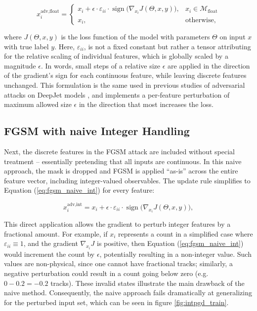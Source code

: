 \begin{equation}
x_i^{\text{adv,float}} = 
    \begin{cases}
        x_i + \epsilon \cdot \varepsilon_{ii} \cdot \operatorname{sign}\!\bigl(\nabla_{x_i} J(\Theta, x, y)\bigr), & x_i\in\mathcal{M}_{\text{float}} \\[6pt]
        x_i, & \text{otherwise},
    \end{cases}
\label{eq:fgsm}
\end{equation}

where $J(\Theta, x, y)$ is the loss function of the model with parameters $\Theta$ on input $x$ with true label $y$. 
Here, $\varepsilon_{ii}$, is not a fixed constant but rather a tensor attributing for the relative scaling of individual features, which is globally scaled by a magnitude $\epsilon$.  
In words, small steps of a relative size $\epsilon$ are applied in the direction of the gradient's sign for each continuous feature, while leaving discrete features unchanged. This formulation is the same used in previous studies of adversarial attacks on DeepJet models \cite{CMS-DP-2024-020}, and implements a per-feature perturbation of maximum allowed size $\epsilon$ in the direction that most increases the loss.

\subsection{FGSM with naive Integer Handling}

Next, the discrete features in the FGSM attack are included without special treatment – essentially pretending that all inputs are continuous. In this naive approach, the mask is dropped and FGSM is applied “as-is” across the entire feature vector, including integer-valued observables. The update rule simplifies to Equation (\ref{eq:fgsm_naive_int}) for every feature:

\begin{equation}
x_i^{\text{adv,int}} = x_i + \epsilon \cdot \varepsilon_{ii} \cdot \operatorname{sign}\!\bigl(\nabla_{x_i} J(\Theta, x, y)\bigr),
\label{eq:fgsm_naive_int}
\end{equation}

This direct application allows the gradient to perturb integer features by a fractional amount. For example, if $x_i$ represents a count in a simplified case where $\varepsilon_{ii}\equiv1$, and the gradient $\nabla_{x_i} J$ is positive, then Equation (\ref{eq:fgsm_naive_int}) would increment the count by $\epsilon$, potentially resulting in a non-integer value. Such values are non-physical, since one cannot have fractional tracks; similarly, a negative perturbation could result in a count going below zero (e.g. $0-0.2=-0.2$ tracks). These invalid states illustrate the main drawback of the naive method. Consequently, the naive approach fails dramatically at generalizing for the perturbed input set, which can be seen in figure \ref{fig:intpgd_train}. 


